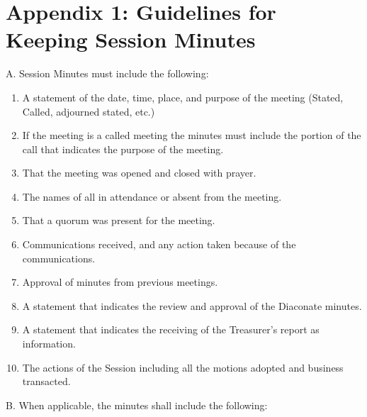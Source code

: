 \documentclass[
]{book}
\providecommand{\tightlist}{%
  \setlength{\itemsep}{0pt}\setlength{\parskip}{0pt}}
\begin{document}
\hypertarget{appendix-1-guidelines-for-keeping-session-minutes}{%
\section*{Appendix 1: Guidelines for Keeping Session Minutes}\label{appendix-1-guidelines-for-keeping-session-minutes}}

A. Session Minutes must include the following:

\begin{enumerate}
\def\labelenumi{\arabic{enumi}.}
\tightlist
\item
  A statement of the date, time, place, and purpose of the meeting (Stated, Called, adjourned stated, etc.)
\item
  If the meeting is a called meeting the minutes must include the portion of the call that indicates the purpose of the meeting.
\item
  That the meeting was opened and closed with prayer.
\item
  The names of all in attendance or absent from the meeting.
\item
  That a quorum was present for the meeting.
\item
  Communications received, and any action taken because of the communications.
\item
  Approval of minutes from previous meetings.
\item
  A statement that indicates the review and approval of the Diaconate minutes.
\item
  A statement that indicates the receiving of the Treasurer's report as information.
\item
  The actions of the Session including all the motions adopted and business transacted.
\end{enumerate}

B. When applicable, the minutes shall include the following:
\end{document}
